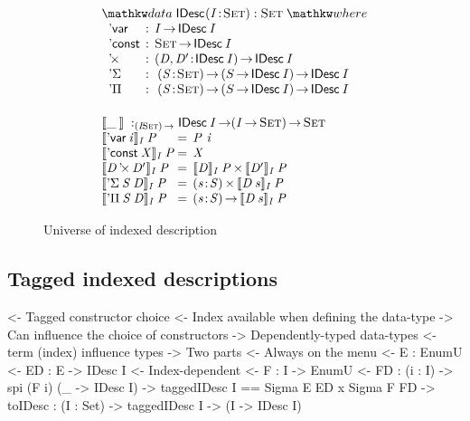 \begin{figure}

\[\stk{
\begin{array}{ll}
\stk{
\data \IDesc{\!} (\Bhab{\V{I}}{\Set}) : \Set \where \\
\;\;\begin{array}{@{}l@{\::\:\:}l@{\quad}l}
    \DVar{}         & I \To \IDesc{I}                                   \\
    \DConst{}       & \Set \To \IDesc{I}                                \\
    \DProd{}{}      & \PI{\V{D}, \V{D'}}{\IDesc{I}} \IDesc{I}           \\
    \DSigma         & \PI{\V{S}}{\Set} \PIS{S \To \IDesc{I}} \IDesc{I}  \\
    \DPi            & \PI{\V{S}}{\Set} \PIS{S \To \IDesc{I}} \IDesc{I} 
\end{array}
}
\vspace{0.2in}
\\
\stk{
\idescop{\_\:}{}{} :_{\PI{\V{I}}{\Set}} \IDesc{\V{I}} \To (\V{\V{I}} \To \Set) \To \Set                  \\
\begin{array}{@{}l@{\:=\:\:}ll}
\idescop{\DVar{\V{i}}}{\V{I}}{\V{P}}      &  \V{P}~\V{i}                                                 \\
\idescop{\DConst{\V{X}}}{\V{I}}{\V{P}}    &  \V{X}                                                   \\
\idescop{\DProd{\V{D}}{\V{D'}}}{\V{I}}{\V{P}} &  \TIMES{\idescop{\V{D}}{\V{I}}{\V{P}}}{\idescop{\V{D'}}{\V{I}}{\V{P}}}       \\
\idescop{\DSigma{\V{S}}{\V{D}}}{\V{I}}{\V{P}} &  \SIGMA{\V{s}}{\V{S}} \idescop{\V{D}\: \V{s}}{\V{I}}{\V{P}}                    \\
\idescop{\DPi{\V{S}}{\V{D}}}{\V{I}}{\V{P}}    &  \PI{\V{s}}{\V{S}} \idescop{\V{D}\: \V{s}}{\V{I}}{\V{P}}            
\end{array}
}
\end{array}
}\]

\caption{Universe of indexed description}
\label{fig:idesc}

\end{figure}

\subsection{Tagged indexed descriptions}

\begin{wstructure}
<- Tagged constructor choice
    <- Index available when defining the data-type
        -> Can influence the choice of constructors
        -> Dependently-typed data-types
            <- term (index) influence types
    -> Two parts
        <- Always on the menu
            <- E : EnumU 
            <- ED : E -> IDesc I
        <- Index-dependent
            <- F : I -> EnumU 
            <- FD : (i : I) -> spi (F i) (\_ -> IDesc I)
        -> taggedIDesc I == Sigma E ED x Sigma F FD
        -> toIDesc : (I : Set) -> taggedIDesc I -> (I -> IDesc I)
\end{wstructure}

